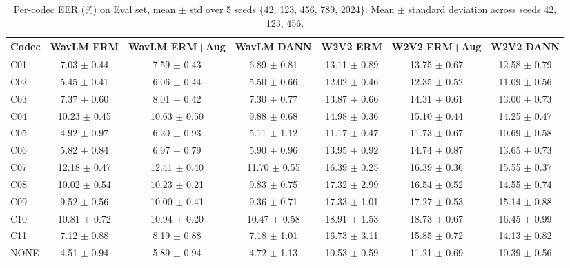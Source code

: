 \begin{table}[t]
\centering
\small
\begin{tabular}{lcccccc}
\toprule
Codec & WavLM ERM & WavLM ERM+Aug & WavLM DANN & W2V2 ERM & W2V2 ERM+Aug & W2V2 DANN \\
\midrule
C01 & 7.03 $\pm$ 0.44 & 7.59 $\pm$ 0.43 & 6.89 $\pm$ 0.81 & 13.11 $\pm$ 0.89 & 13.75 $\pm$ 0.67 & 12.58 $\pm$ 0.79 \\
C02 & 5.45 $\pm$ 0.41 & 6.06 $\pm$ 0.44 & 5.50 $\pm$ 0.66 & 12.02 $\pm$ 0.46 & 12.35 $\pm$ 0.52 & 11.09 $\pm$ 0.56 \\
C03 & 7.37 $\pm$ 0.60 & 8.01 $\pm$ 0.42 & 7.30 $\pm$ 0.77 & 13.87 $\pm$ 0.66 & 14.31 $\pm$ 0.61 & 13.00 $\pm$ 0.73 \\
C04 & 10.23 $\pm$ 0.45 & 10.63 $\pm$ 0.50 & 9.88 $\pm$ 0.68 & 14.98 $\pm$ 0.36 & 15.10 $\pm$ 0.44 & 14.25 $\pm$ 0.47 \\
C05 & 4.92 $\pm$ 0.97 & 6.20 $\pm$ 0.93 & 5.11 $\pm$ 1.12 & 11.17 $\pm$ 0.47 & 11.73 $\pm$ 0.67 & 10.69 $\pm$ 0.58 \\
C06 & 5.82 $\pm$ 0.84 & 6.97 $\pm$ 0.79 & 5.90 $\pm$ 0.96 & 13.95 $\pm$ 0.92 & 14.74 $\pm$ 0.87 & 13.65 $\pm$ 0.73 \\
C07 & 12.18 $\pm$ 0.47 & 12.41 $\pm$ 0.40 & 11.70 $\pm$ 0.55 & 16.39 $\pm$ 0.25 & 16.39 $\pm$ 0.36 & 15.55 $\pm$ 0.37 \\
C08 & 10.02 $\pm$ 0.54 & 10.23 $\pm$ 0.21 & 9.83 $\pm$ 0.75 & 17.32 $\pm$ 2.99 & 16.54 $\pm$ 0.52 & 14.55 $\pm$ 0.74 \\
C09 & 9.52 $\pm$ 0.56 & 10.00 $\pm$ 0.41 & 9.36 $\pm$ 0.71 & 17.33 $\pm$ 1.01 & 17.27 $\pm$ 0.53 & 15.14 $\pm$ 0.88 \\
C10 & 10.81 $\pm$ 0.72 & 10.94 $\pm$ 0.20 & 10.47 $\pm$ 0.58 & 18.91 $\pm$ 1.53 & 18.73 $\pm$ 0.67 & 16.45 $\pm$ 0.99 \\
C11 & 7.12 $\pm$ 0.88 & 8.19 $\pm$ 0.88 & 7.18 $\pm$ 1.01 & 16.73 $\pm$ 3.11 & 15.85 $\pm$ 0.72 & 14.13 $\pm$ 0.82 \\
NONE & 4.51 $\pm$ 0.94 & 5.89 $\pm$ 0.94 & 4.72 $\pm$ 1.13 & 10.53 $\pm$ 0.59 & 11.21 $\pm$ 0.69 & 10.39 $\pm$ 0.56 \\
\bottomrule
\end{tabular}
\caption{Per-codec EER (\%) on Eval set, mean $\pm$ std over 5 seeds \{42, 123, 456, 789, 2024\}. Mean $\pm$ standard deviation across seeds {42, 123, 456}.}
\label{tab:T2_per_codec_eer_seeds}
\end{table}
